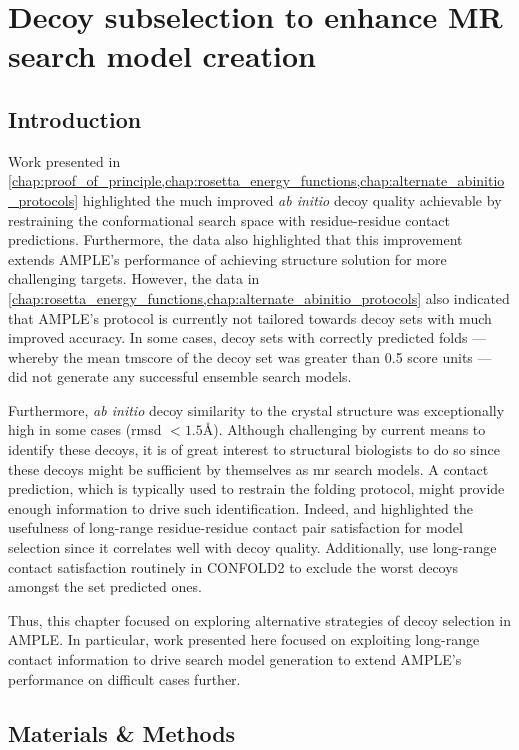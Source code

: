 \chapter{Decoy subselection to enhance MR search model creation} \label{chap:ample_decoys}
\clearpage

\section{Introduction}
Work presented in \cref{chap:proof_of_principle,chap:rosetta_energy_functions,chap:alternate_abinitio_protocols} highlighted the much improved \textit{ab initio} decoy quality achievable by restraining the conformational search space with residue-residue contact predictions. Furthermore, the data also highlighted that this improvement extends AMPLE's performance of achieving structure solution for more challenging targets. However, the data in \cref{chap:rosetta_energy_functions,chap:alternate_abinitio_protocols} also indicated that AMPLE's protocol is currently not tailored towards decoy sets with much improved accuracy. In some cases, decoy sets with correctly predicted folds --- whereby the mean \gls{tmscore} of the decoy set was greater than 0.5 score units --- did not generate any successful ensemble search models.

Furthermore, \textit{ab initio} decoy similarity to the crystal structure was exceptionally high in some cases (\gls{rmsd} $<1.5$\AA). Although challenging by current means to identify these decoys, it is of great interest to structural biologists to do so since these decoys might be sufficient by themselves as \gls{mr} search models. A contact prediction, which is typically used to restrain the folding protocol, might provide enough information to drive such identification. Indeed, \textcite{Kosciolek2014-bt} and \textcite{De_Oliveira2016-gj} highlighted the usefulness of long-range residue-residue contact pair satisfaction for model selection since it correlates well with decoy quality. Additionally, \textcite{Adhikari2018-lj} use long-range contact satisfaction routinely in CONFOLD2 to exclude the worst decoys amongst the set predicted ones.

Thus, this chapter focused on exploring alternative strategies of decoy selection in AMPLE. In particular, work presented here focused on exploiting long-range contact information to drive search model generation to extend AMPLE's performance on difficult cases further.

\section{Materials \& Methods}
